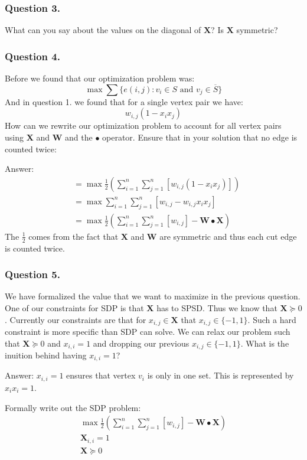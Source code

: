 \documentclass{article}
\begin{document}
\subsubsection{Question 3.}
What can you say about the values on the diagonal of \( \mathbf{X} \)? Is \( \mathbf{X} \) symmetric?

\subsubsection{Question 4.}
Before we found that our optimization problem was:
\[
  \max \sum \{ e(i, j): v_i \in S \text{ and } v_j \in \overline{S} \}
\]
And in question 1. we found that for a single vertex pair we have:
\[
w_{i, j}(1 - x_i x_j)
\]
How can we rewrite our optimization problem to account for all vertex pairs using \( \mathbf{X} \) and \( \mathbf{W} \) and the \( \bullet \) operator.
Ensure that in your solution that no edge is counted twice:

Answer:
\begin{align*}
 &= \max \frac{1}{2} \left (\sum_{i = 1}^n \sum_{j = 1}^n[ w_{i, j}(1 - x_i x_j) ] \right)\\
 &= \max  \sum_{i = 1}^n \sum_{j = 1}^n[ w_{i, j} - w_{i, j} x_i x_j ]\\
 &= \max \frac{1}{2} \left ( \sum_{i = 1}^n \sum_{j = 1}^n[w_{i, j}] - \mathbf{W} \bullet \mathbf{X} \right )
\end{align*}
The \( \frac{1}{2} \) comes from the fact that \( \mathbf{X} \) and \( \mathbf{W} \) are symmetric and thus each cut edge is counted twice.

\subsubsection{Question 5.}
We have formalized the value that we want to maximize in the previous question.
One of our constraints for SDP is that \( \mathbf{X} \) has to SPSD.
Thus we know that \( \mathbf{X} \succeq 0 \).
Currently our constraints are that for \( x_{i, j} \in \mathbf{X} \) that \( x_{i, j} \in \{ -1, 1 \} \).
Such a hard constraint is more specific than SDP can solve.
We can relax our problem such that \( \mathbf{X} \succeq 0\) and \( x_{i, i} = 1 \) and dropping our previous \( x_{i, j} \in \{ -1, 1 \} \).
What is the inuition behind having \( x_{i, i} = 1 \)?

Answer: \( x_{i, i} = 1 \) ensures that vertex \( v_i \) is only in one set. This is represented by \( x_i x_i = 1 \).

Formally write out the SDP problem:
\begin{gather*}
\max \frac{1}{2} \left ( \sum_{i = 1}^n \sum_{j = 1}^n[w_{i, j}] - \mathbf{W} \bullet \mathbf{X} \right ) \\
\mathbf{X}_{i, i} = 1 \\
\mathbf{X} \succeq 0 \\
\end{gather*}
\end{document}
